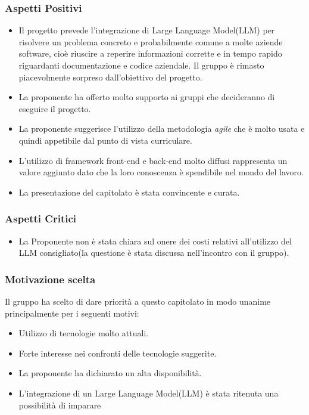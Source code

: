 \documentclass[a4paper, 12pt]{article}
\begin{document}
\subsubsection{Aspetti Positivi}
\begin{itemize}
    \item Il progetto prevede l’integrazione di Large Language Model(LLM) per risolvere un problema concreto e probabilmente comune a molte aziende software, cioè riuscire a reperire informazioni corrette e in tempo rapido riguardanti documentazione e codice aziendale.
    Il gruppo è rimasto piacevolmente sorpreso dall'obiettivo del progetto.
    
    \item La proponente ha offerto molto supporto ai gruppi che decideranno di eseguire il progetto.
    
    \item La proponente suggerisce l’utilizzo della metodologia \textit{agile} che è molto usata e quindi appetibile dal punto di vista curriculare.
    
    \item L’utilizzo di framework front-end e back-end molto diffusi rappresenta un valore aggiunto dato che la loro conoscenza è spendibile nel mondo del lavoro.
    
    \item La presentazione del capitolato è stata convincente e curata.
    
\end{itemize}

\subsubsection{Aspetti Critici}
\begin{itemize}
    \item La Proponente non è stata chiara sul onere dei costi relativi all’utilizzo del LLM consigliato(la questione è stata discussa nell'incontro con il gruppo).
\end{itemize}

\subsubsection{Motivazione scelta}
Il gruppo ha scelto di dare priorità a questo capitolato in modo unanime principalmente per i seguenti motivi:
\begin{itemize}
    \item Utilizzo di tecnologie molto attuali.
    \item Forte interesse nei confronti delle tecnologie suggerite.
    \item La proponente ha dichiarato un alta disponibilità.
    \item L'integrazione di un Large Language Model(LLM) è stata ritenuta una possibilità di imparare   
\end{itemize}
\end{document}
